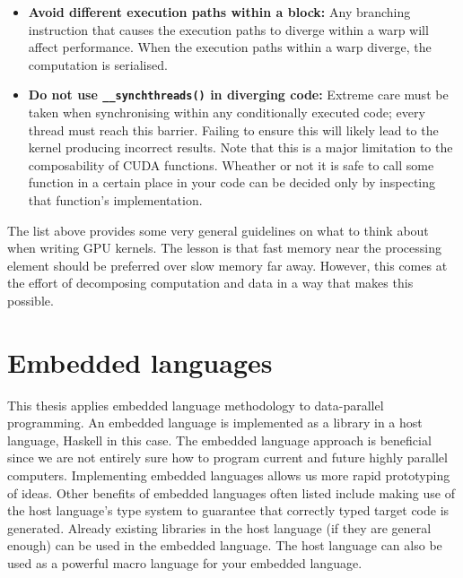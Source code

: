 \documentclass[a4paper]{book}
\begin{document}
\begin{itemize}
\item {\bf Avoid different execution paths within a block:} Any branching instruction that 
causes the execution paths to diverge within a warp will affect performance. When the execution 
paths within a warp diverge, the computation is serialised. 

\item {\bf Do not use {\tt \_\_synchthreads()} in diverging code:} Extreme care must be taken 
when synchronising within any conditionally executed code; every thread must reach this barrier.
Failing to ensure this will likely lead to the kernel producing incorrect results. Note that 
this is a major limitation to the composability of CUDA functions. Wheather or not it is safe to 
call some function in a certain place in your code can be decided only by inspecting that function's 
implementation. 
\end{itemize} 

The list above provides some very general guidelines on what to think about when 
writing GPU kernels. The lesson is that fast memory near the processing element 
should be preferred over slow memory far away. However, this comes at the effort 
of decomposing computation and data in a way that makes this possible. 
 



%
%
\section{Embedded languages}

This thesis applies embedded language methodology to data-parallel programming. An 
embedded language is implemented as a library in a host language, Haskell in this case. 
The embedded language approach is beneficial since we are not entirely sure how 
to program current and future highly parallel computers. Implementing embedded languages allows 
us more rapid prototyping of ideas. Other benefits of embedded languages often listed 
include making use of the host language's type system to guarantee that correctly typed target code is generated. 
Already existing libraries in the host language (if they are general enough) 
can be used in the embedded language. The host language can also be used as a powerful macro 
language for your embedded language. 
\end{document}
